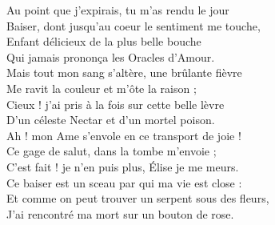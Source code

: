 \documentclass[12pt,a4paper]{article}
\begin{document}
\newpage
Au point que j’expirais, tu m’as rendu le jour\\
Baiser, dont jusqu’au coeur le sentiment me touche,\\
Enfant délicieux de la plus belle bouche\\
Qui jamais prononça les Oracles d’Amour.\\

Mais tout mon sang s’altère, une brûlante fièvre\\
Me ravit la couleur et m’ôte la raison ;\\
Cieux ! j’ai pris à la fois sur cette belle lèvre\\
D’un céleste Nectar et d’un mortel poison.\\

Ah ! mon Ame s’envole en ce transport de joie !\\
Ce gage de salut, dans la tombe m’envoie ;\\
C’est fait ! je n’en puis plus, Élise je me meurs.\\

Ce baiser est un sceau par qui ma vie est close :\\
Et comme on peut trouver un serpent sous des fleurs,\\
J’ai rencontré ma mort sur un bouton de rose.\\
\end{document}
